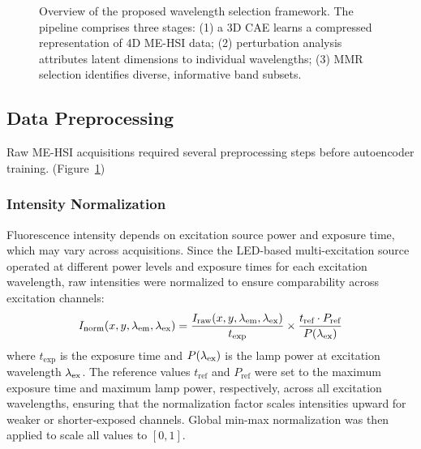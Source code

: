 \begin{figure}[!t]
\caption{Overview of the proposed wavelength selection framework. The pipeline comprises three stages: (1) a 3D CAE learns a compressed representation of 4D ME-HSI data; (2) perturbation analysis attributes latent dimensions to individual wavelengths; (3) MMR selection identifies diverse, informative band subsets.}
\label{fig:pipeline}
\end{figure}

\subsection{Data Preprocessing}
\label{sec:preprocessing}

Raw ME-HSI acquisitions required several preprocessing steps before autoencoder training. (Figure~\ref{fig:pipeline})

\subsubsection{Intensity Normalization}
Fluorescence intensity depends on excitation source power and exposure time, which may vary across acquisitions.
Since the LED-based multi-excitation source operated at different power levels and exposure times for each excitation wavelength, raw intensities were normalized to ensure comparability across excitation channels:
\begin{equation}
I_{\text{norm}}(x, y, \lambda_{\text{em}}, \lambda_{\text{ex}}) = \frac{I_{\text{raw}}(x, y, \lambda_{\text{em}}, \lambda_{\text{ex}})}{t_{\text{exp}}} \times \frac{t_{\text{ref}} \cdot P_{\text{ref}}}{P(\lambda_{\text{ex}})}
\label{eq:normalization}
\end{equation}
where $t_{\text{exp}}$ is the exposure time and $P(\lambda_{\text{ex}})$ is the lamp power at excitation wavelength $\lambda_{\text{ex}}$.
The reference values $t_{\text{ref}}$ and $P_{\text{ref}}$ were set to the maximum exposure time and maximum lamp power, respectively, across all excitation wavelengths, ensuring that the normalization factor scales intensities upward for weaker or shorter-exposed channels.
Global min-max normalization was then applied to scale all values to $[0, 1]$.


